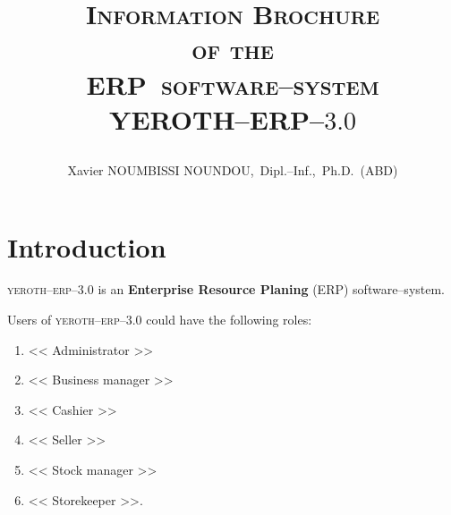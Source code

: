 \documentclass[a4paper, 10pt, twocolumn]{article}
\newcommand{\pos}{ERP~software--system\xspace}
\newcommand{\yerenpos}{\textcolor{yerenColorBlue}{\sc YEROTH--ERP--$3.0$}\xspace}
\newcommand{\myfullacademicname}{Xavier NOUMBISSI NOUNDOU,~Dipl.--Inf.,~Ph.D.~(ABD)\xspace}
\newcommand{\yeren}{\textsc{yeroth--erp--3.0}\xspace}
\newcommand{\administrator}{<< Administrator >>\xspace}
\newcommand{\manager}{<< Business manager >>\xspace}
\newcommand{\seller}{<< Seller >>\xspace}
\newcommand{\inventorystockmanager}{<< Stock manager >>\xspace}
\newcommand{\storekeeper}{<< Storekeeper >>\xspace}
\newcommand{\cashier}{<< Cashier >>\xspace}
\begin{document}
\title{\textcolor{medgreen}{
\vspace{0em}
\textsc{Information Brochure \\
of the \\
\pos \\ \vspace{1em}
\yerenpos}}
\author{\myfullacademicname}
}

\date{} 
\maketitle
\thispagestyle{fancy}



\vspace{-1.5em}
\section{Introduction}
\vspace{-0.3em}
\yeren is an \textbf{Enterprise Resource Planing} (ERP)
software--system. 

Users of \yeren could have the following roles:
\begin{enumerate}[1)]
	\itemsep -0.6em
	\item \administrator
	\item \manager
	\item \cashier
	\item \seller
	\item \inventorystockmanager
	\item \storekeeper.	
\end{enumerate}
\end{document}
